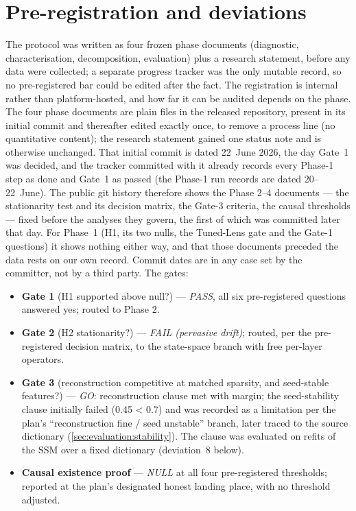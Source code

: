 \section{Pre-registration and deviations}
\label{app:prereg}

The protocol was written as four frozen phase documents (diagnostic,
characterisation, decomposition, evaluation) plus a research statement, before
any data were collected; a separate progress tracker was the only mutable
record, so no pre-registered bar could be edited after the fact. The
registration is internal rather than platform-hosted, and how far it can be
audited depends on the phase. The four phase documents are plain files in the
released repository, present in its initial commit and thereafter edited
exactly once, to remove a process line (no quantitative content); the
research statement gained one status note and is otherwise unchanged. That
initial commit is dated 22~June 2026, the day Gate~1 was decided, and the
tracker committed with it already records every Phase-1 step as done and
Gate~1 as passed (the Phase-1 run records are dated 20--22~June). The public
git history therefore shows the Phase 2--4 documents --- the stationarity
test and its decision matrix, the Gate-3 criteria, the causal thresholds ---
fixed before the analyses they govern, the first of which was committed later
that day. For Phase~1 (H1, its two nulls, the Tuned-Lens gate and the Gate-1
questions) it shows nothing either way, and that those documents preceded the
data rests on our own record. Commit dates are in any case set by the
committer, not by a third party. The gates:

\begin{itemize}
  \item \textbf{Gate 1} (H1 supported above null?) --- \emph{PASS}, all six
    pre-registered questions answered yes; routed to Phase 2.
  \item \textbf{Gate 2} (H2 stationarity?) --- \emph{FAIL (pervasive drift)};
    routed, per the pre-registered decision matrix, to the state-space branch
    with free per-layer operators.
  \item \textbf{Gate 3} (reconstruction competitive at matched sparsity, and
    seed-stable features?) --- \emph{GO}: reconstruction clause met with
    margin; the seed-stability clause initially failed (0.45 < 0.7) and was
    recorded as a limitation per the plan's ``reconstruction fine / seed
    unstable'' branch, later traced to the source dictionary
    (\cref{sec:evaluation:stability}). The clause was evaluated on refits of
    the SSM over a fixed dictionary (deviation~8 below).
  \item \textbf{Causal existence proof} --- \emph{NULL} at all four
    pre-registered thresholds; reported at the plan's designated honest
    landing place, with no threshold adjusted.
\end{itemize}

